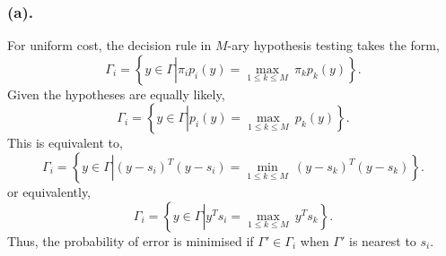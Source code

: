 \documentclass[a4paper,english,12pt]{article}
\begin{document}
\subsubsection*{(a).} For uniform cost, the decision rule in $M$-ary hypothesis testing takes the form,
\begin{equation*}
\Gamma_i=\left\lbrace y\in \Gamma \left|  \pi_i p_i(y)= \underset{1\leq k \leq M}{\max}~\pi_k p_k(y)\right.\right\rbrace.
\end{equation*}
Given the hypotheses are equally likely, 
\begin{equation*}
\Gamma_i=\left\lbrace y\in \Gamma \left|  p_i(y)= \underset{1\leq k \leq M}{\max}~p_k(y)\right.\right\rbrace.
\end{equation*}
This is equivalent to,
\begin{equation*}
\Gamma_i=\left\lbrace y\in \Gamma \left|  (y-s_{i})^T(y-s_{i})= \underset{1\leq k \leq M}{\min}~(y-s_{k})^T(y-s_{k})\right.\right\rbrace.
\end{equation*}
or equivalently,
\begin{equation*}
\Gamma_i=\left\lbrace y\in \Gamma \left|  y^Ts_{i}= \underset{1\leq k \leq M}{\max}~y^Ts_{k}\right.\right\rbrace.
\end{equation*}
Thus, the probability of error is minimised if $\Gamma' \in \Gamma_{i} $ when $\Gamma'$ is nearest to $s_{i}$.
\end{document}
